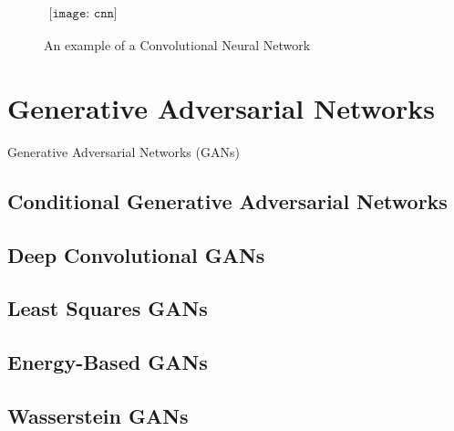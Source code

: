 \documentclass{article}
\begin{document}
\begin{figure}[!htb]
   \begin{center}$
      \begin{array}{cccc}
         \texttt{[image: cnn]}
      \end{array}$
   \end{center}
   \caption{An example of a Convolutional Neural Network}
\end{figure}

\section{Generative Adversarial Networks}
\noindent Generative Adversarial Networks (GANs) 

\subsection{Conditional Generative Adversarial Networks}

\subsection{Deep Convolutional GANs}

\subsection{Least Squares GANs}


\subsection{Energy-Based GANs}


\subsection{Wasserstein GANs}
\end{document}
